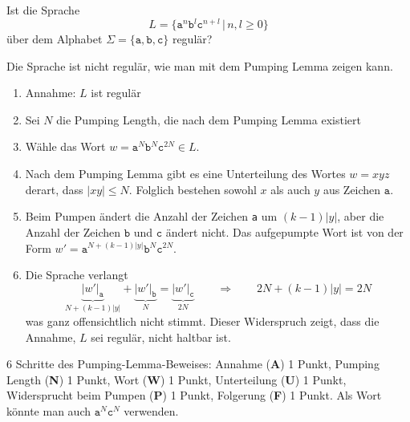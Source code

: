Ist die Sprache
\[
L = \{ \texttt{a}^n \texttt{b}^l \texttt{c}^{n+l}\,|\, n,l\ge 0\}
\]
über dem Alphabet $\Sigma=\{\texttt{a},\texttt{b},\texttt{c}\}$ regulär?


\begin{loesung}
Die Sprache ist nicht regulär, wie man mit dem Pumping Lemma zeigen kann.
\begin{enumerate}
\item Annahme: $L$ ist regulär
\item Sei $N$ die Pumping Length, die nach dem Pumping Lemma existiert
\item Wähle das Wort $w=\texttt{a}^N \texttt{b}^N \texttt{c}^{2N}\in L$.
\item Nach dem Pumping Lemma gibt es eine Unterteilung des Wortes $w=xyz$
derart, dass $|xy|\le N$. Folglich bestehen sowohl $x$ als auch $y$ aus
Zeichen $\texttt{a}$.
\item Beim Pumpen ändert die Anzahl der Zeichen \texttt{a} um $(k-1)|y|$,
aber die Anzahl der Zeichen $\texttt{b}$ und $\texttt{c}$ ändert nicht.
Das aufgepumpte Wort ist von der Form
$w'=\texttt{a}^{N+(k-1)|y|}\texttt{b}^N\texttt{c}^{2N}$.
\item
Die Sprache verlangt
\[
\underbrace{|w'|_{\texttt{a}}}_{\displaystyle N+(k-1)|y|}
+
\underbrace{|w'|_{\texttt{b}}}_{\displaystyle N}
=
\underbrace{|w'|_{\texttt{c}}}_{\displaystyle 2N}
\qquad\Rightarrow\qquad
2N+(k-1)|y|=2N
\]
was ganz offensichtlich nicht stimmt.
Dieser Widerspruch zeigt, dass die Annahme, $L$ sei regulär,
nicht haltbar ist.
\qedhere
\end{enumerate}
\end{loesung}

\begin{bewertung}
6 Schritte des Pumping-Lemma-Beweises:
Annahme ({\bf A}) 1 Punkt, 
Pumping Length ({\bf N}) 1 Punkt,
Wort ({\bf W}) 1 Punkt,
Unterteilung ({\bf U}) 1 Punkt,
Widersprucht beim Pumpen ({\bf P}) 1 Punkt,
Folgerung ({\bf F}) 1 Punkt.
Als Wort könnte man auch $\texttt{a}^N\texttt{c}^N$ verwenden.
\end{bewertung}

